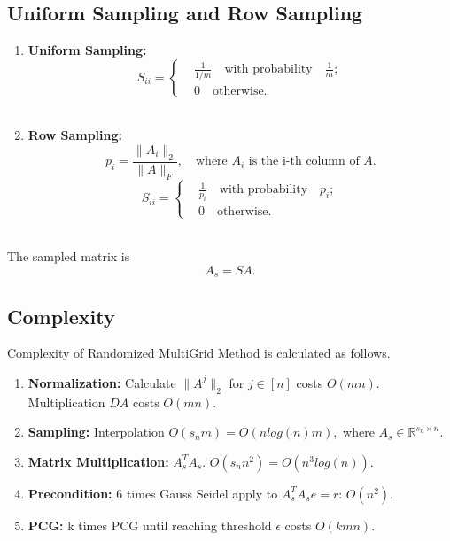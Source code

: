 \subsection{Uniform Sampling and Row Sampling}
\begin{enumerate}
\item \textbf{Uniform Sampling:}
$$
S_{ii} = \begin{cases} & \frac{1}{1/m} \quad \text{with probability} \quad \frac{1}{m}; \\
                             & 0 \quad \text{otherwise.}
                             \end{cases}
$$\\
\item \textbf{Row Sampling:}
$$
p_i = \frac{\| A_i \|_2}{\| A \|_F}, \quad \text{where $A_i$ is the i-th column of $A$}.
$$
$$
S_{ii} = \begin{cases} & \frac{1}{p_i} \quad \text{with probability} \quad p_i; \\
                             & 0 \quad \text{otherwise.}
                             \end{cases}
$$\\
\end{enumerate}
The sampled matrix is
$$
A_s = SA.
$$


\subsection{Complexity}
Complexity of Randomized MultiGrid Method is calculated as follows.
\begin{tcolorbox}
\begin{enumerate}
\item \textbf{Normalization:} Calculate $\|A^j\|_2 $ for $j \in [n]$ costs $O(mn)$. Multiplication $D A$ costs $O(mn)$.  \\
\item \textbf{Sampling: } Interpolation $O(s_n m ) = O(n log(n) m), $ where \quad $A_s \in \mathbb{R}^{s_n \times n}. $ \\
\item \textbf{Matrix Multiplication: } $A_s^T A_s.$ $O(s_n n^2) = O(n^3 log(n)). $ \\
\item \textbf{Precondition:} 6 times Gauss Seidel apply to $A_s^TA_s e =r $: $O(n^2). $\\
\item \textbf{PCG:} k times PCG until reaching threshold $\epsilon$ costs  $O(k mn). $
\end{enumerate}
\end{tcolorbox}

